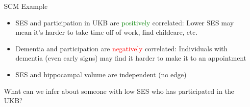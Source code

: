 \documentclass[
  ignorenonframetext,
]{beamer}
\providecommand{\tightlist}{%
  \setlength{\itemsep}{0pt}\setlength{\parskip}{0pt}}
\begin{document}
\begin{frame}{SCM Example}
\protect\hypertarget{scm-example}{}

\begin{figure}
\centering
{}
\end{figure}

\begin{itemize}
\tightlist
\item
  SES and participation in UKB are \textcolor{green}{positively}
  correlated: Lower SES may mean it's harder to take time off of work,
  find childcare, etc.
\item
  Dementia and participation are \textcolor{red}{negatively} correlated:
  Individuals with dementia (even early signs) may find it harder to
  make it to an appointment
\item
  SES and hippocampal volume are independent (no edge)
\end{itemize}

What can we infer about someone with low SES who has participated in the
UKB?

\end{frame}
\end{document}
